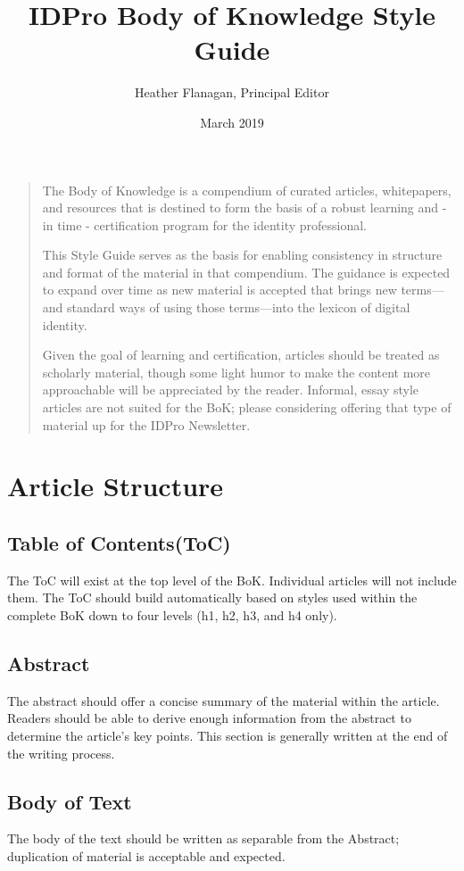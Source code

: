 \documentclass[]{article}
\title{IDPro Body of Knowledge Style Guide}
\author{Heather Flanagan, Principal Editor}
\date{March 2019}
\begin{document}
\maketitle

\begin{quotation}
The Body of Knowledge is a compendium of curated articles, whitepapers, and resources that is destined to form the basis of a robust learning and - in time - certification program for the identity professional.
	
This Style Guide serves as the basis for enabling consistency in structure and format of the material in that compendium. The guidance is expected to expand over time as new material is accepted that brings new terms—and standard ways of using those terms—into the lexicon of digital identity.
	
Given the goal of learning and certification, articles should be treated as scholarly material, though some light humor to make the content more approachable will be appreciated by the reader. Informal, essay style articles are not suited for the BoK; please considering offering that type of material up for the IDPro Newsletter.
\end{quotation}


\section{Article Structure}
\subsection{Table of Contents(ToC)}
The ToC will exist at the top level of the BoK. Individual articles will not include them. The ToC should build automatically based on styles used within the complete BoK down to four levels (h1, h2, h3, and h4 only).

\subsection{Abstract}
The abstract should offer a concise summary of the material within the article. Readers should be able to derive enough information from the abstract to determine the article’s key points. This section is generally written at the end of the writing process.

\subsection{Body of Text}
The body of the text should be written as separable from the Abstract; duplication of material is acceptable and expected.
\end{document}
